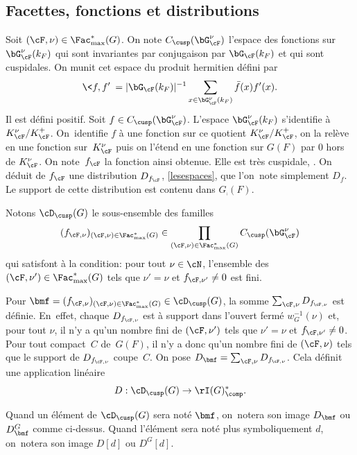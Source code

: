 \subsection{Facettes, fonctions et distributions}\label{facettesfonctions}
Soit $(\cF,\nu)\in \Fac_{\max}^*(G)$. On note $C_{\cusp}(\bG^{\nu}_{\cF})$ l'espace des fonctions sur $\bG^{\nu}_{\cF}(k_{F})$ qui sont invariantes par conjugaison par $\bG_{\cF}(k_{F})$ et qui sont cuspidales. On munit cet espace du produit hermitien défini par
\[
\<f,f'\>=\vert \bG_{\cF}(k_{F})\vert ^{-1}\sum_{x\in \bG^{\nu}_{\cF}(k_{F})}\bar{f}(x)f'(x).
\]
Il est défini positif. Soit $f\in C_{\cusp}(\bG^{\nu}_{\cF})$. L'espace $\bG_{\cF}^{\nu}(k_{F})$ s'identifie à $K_{\cF}^{\nu}/K_{\cF}^+$. On~identifie $f$ à une fonction sur ce quotient $K_{\cF}^{\nu}/K_{\cF}^+$, on la relève en une fonction sur~$K_{\cF}^{\nu}$ puis on l'étend en une fonction sur $G(F)$ par $0$ hors de $K_{\cF}^{\nu}$. On note~$f_{\cF}$ la fonction ainsi obtenue. Elle est très cuspidale, \cf \cite[Lem.\,10]{W2}. On déduit de $f_{\cF}$ une distribution $D_{f_{\cF}}$, \cf \ref{lesespaces}, que l'on~note simplement $D_{f}$. Le support de cette distribution est contenu dans $G_{\comp}(F)$.

Notons $\boldsymbol{\cD}_{\cusp}(G)$ le sous-ensemble des familles
\[
(f_{\cF,\nu})_{(\cF,\nu)\in \Fac^*_{\max}(G)}\in \prod_{(\cF,\nu)\in \Fac^*_{\max}(G)}C_{\cusp}(\bG^{\nu}_{\cF})
\]
qui satisfont à la condition: pour tout $\nu\in \cN$, l'ensemble des $(\cF,\nu')\in \Fac^*_{\max}(G)$ tels que $\nu'=\nu$ et $f_{\cF,\nu'}\neq0$ est fini.

Pour $\bmf=(f_{\cF,\nu})_{(\cF,\nu)\in \Fac^*_{\max}(G)}\in \boldsymbol{\cD}_{\cusp}(G)$, la somme $\sum_{\cF,\nu}D_{f_{\cF,\nu}}$ est définie. \hbox{En~effet}, chaque $D_{f_{\cF,\nu}}$ est à support dans l'ouvert fermé $w_{G}^{-1}(\nu)$ et, pour tout $\nu$, il n'y a qu'un nombre fini de $(\cF,\nu')$ tels que $\nu'=\nu$ et $f_{\cF,\nu'}\neq0$. Pour tout compact~$C$ de~$G(F)$, il n'y a donc qu'un nombre fini de $(\cF,\nu)$ tels que le support de $D_{f_{\cF,\nu}}$ coupe~$C$. On pose $D_{\bmf}=\sum_{\cF,\nu}D_{f_{\cF,\nu}}$. Cela définit une application linéaire
\[
D: \boldsymbol{\cD}_{\cusp}(G)\to \rI(G)_{\comp}^*.
\]

\begin{rem*}
Quand un élément de $\boldsymbol{\cD}_{\cusp}(G)$ sera noté $\bmf$, on~notera son image $D_{\bmf}$ ou $D^G_{\bmf}$ comme ci-dessus. Quand l'élément sera noté plus symboliquement $d$, on~notera son image $D[d]$ ou $D^G[d]$.
\end{rem*}

